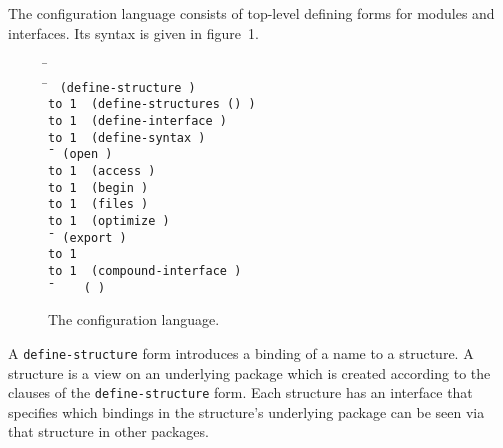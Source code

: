 The configuration language consists of top-level defining forms for
modules and interfaces.  Its syntax is given in figure~1.

\hbox{\goesto}
\newcommand{\altz}{\hbox to 1\wd0{\hfil\alt}}


\begin{figure}
\begin{tabbing}
    \=\goesto{}~ \\
    \=\goesto{}~
      \tt(define-structure  
          ) \\
	\>\altz{}~ \tt(define-structures ()
          ) \\
	\>\altz{}~ \tt(define-interface  ) \\
	\>\altz{}~ \tt(define-syntax  ) \\
    \=\goesto{}~ \tt(open ) \\
	\>\altz{}~ \tt(access ) \\
	\>\altz{}~ \tt(begin ) \\
	\>\altz{}~ \tt(files ) \\
	\>\altz{}~ \tt(optimize ) \\
    \=\goesto{}~ \tt(export ) \\
	\>\altz{}~  \\
	\>\altz{}~ \tt(compound-interface ) \\
    \=\goesto{}~  ~\alt{}~ \tt( )
\end{tabbing}
\caption{The configuration language.}
\end{figure}


A {\tt define-structure} form introduces a binding of a name to a
structure.  A structure is a view on an underlying package which is
created according to the clauses of the {\tt define-structure} form.
Each structure has an interface that specifies which bindings in the
structure's underlying package can be seen via that structure in other
packages.

